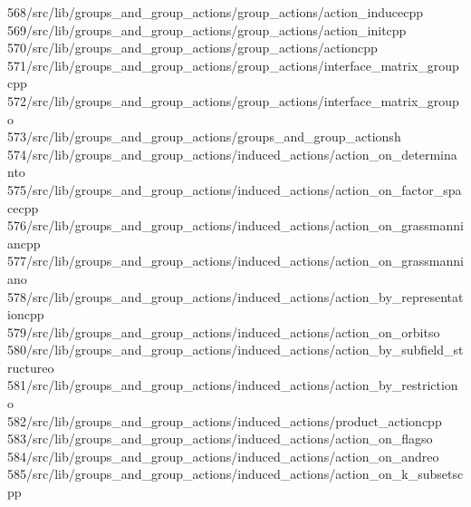 \begin{tabbing}
568\>/src/lib/groups\_and\_group\_actions/group\_actions/action\_inducecpp\\[0pt]
569\>/src/lib/groups\_and\_group\_actions/group\_actions/action\_initcpp\\[0pt]
570\>/src/lib/groups\_and\_group\_actions/group\_actions/actioncpp\\[0pt]
571\>/src/lib/groups\_and\_group\_actions/group\_actions/interface\_matrix\_groupcpp\\[0pt]
572\>/src/lib/groups\_and\_group\_actions/group\_actions/interface\_matrix\_groupo\\[0pt]
573\>/src/lib/groups\_and\_group\_actions/groups\_and\_group\_actionsh\\[0pt]
574\>/src/lib/groups\_and\_group\_actions/induced\_actions/action\_on\_determinanto\\[0pt]
575\>/src/lib/groups\_and\_group\_actions/induced\_actions/action\_on\_factor\_spacecpp\\[0pt]
576\>/src/lib/groups\_and\_group\_actions/induced\_actions/action\_on\_grassmanniancpp\\[0pt]
577\>/src/lib/groups\_and\_group\_actions/induced\_actions/action\_on\_grassmanniano\\[0pt]
578\>/src/lib/groups\_and\_group\_actions/induced\_actions/action\_by\_representationcpp\\[0pt]
579\>/src/lib/groups\_and\_group\_actions/induced\_actions/action\_on\_orbitso\\[0pt]
580\>/src/lib/groups\_and\_group\_actions/induced\_actions/action\_by\_subfield\_structureo\\[0pt]
581\>/src/lib/groups\_and\_group\_actions/induced\_actions/action\_by\_restrictiono\\[0pt]
582\>/src/lib/groups\_and\_group\_actions/induced\_actions/product\_actioncpp\\[0pt]
583\>/src/lib/groups\_and\_group\_actions/induced\_actions/action\_on\_flagso\\[0pt]
584\>/src/lib/groups\_and\_group\_actions/induced\_actions/action\_on\_andreo\\[0pt]
585\>/src/lib/groups\_and\_group\_actions/induced\_actions/action\_on\_k\_subsetscpp\\[0pt]

\end{tabbing}
